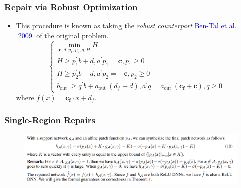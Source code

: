 \documentclass[aspectratio=169 %
,serif,mathserif]{beamer}
\begin{document}
\begin{frame}
	\frametitle{Repair via Robust Optimization}
	\begin{itemize}
		\item This procedure is known as taking the \emph{robust counterpart }\textcolor{blue}{Ben-Tal et al. [2009]} of the original problem.
		\begin{equation}
			\left\{\begin{array}{l}
				\min _{\boldsymbol{c}, d, p_1, p_2, q, H} H \\
				H \geq p_1^{\prime} b+d, a^{\prime} p_1=\boldsymbol{c}, p_1 \geq 0 \\
				H \geq p_2^{\prime} b-d, a^{\prime} p_2=-\boldsymbol{c}, p_2 \geq 0 \\
				b_{\text {out }} \geq q^{\prime} b+a_{\text {out }}\left(d_f+d\right), a^{\prime} q=a_{\text {out }}\left(\boldsymbol{c}_{\boldsymbol{f}}+\boldsymbol{c}\right), q \geq 0
				\end{array}\right.
		\end{equation}
		where $f (x) = \boldsymbol{c}_{\boldsymbol{f}}\cdot x + d_f$. 
	\end{itemize}
\end{frame}

\begin{frame}
	\frametitle{Single-Region Repairs}
	\begin{figure}[htbp]
		\includegraphics[width=\linewidth]{5.png}
	\end{figure}
\end{frame}
\end{document}
